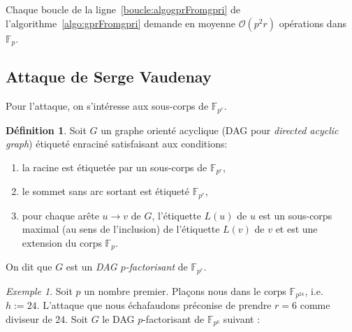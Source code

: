 \documentclass[a4paper, titlepage, 11pt]{article}
\theoremstyle{definition}
\newtheorem{defi}[theo]{Définition}
\theoremstyle{remark}
\newtheorem{exem}[theo]{Exemple}
\def\O{\mathcal O}
\def\gf #1{\mathbb{F}_{#1}}
\begin{document}
Chaque boucle de la ligne~\ref{boucle:algogprFromgpri} de l'algorithme~\ref{algo:gprFromgpri} demande en moyenne $\O(p^2r)$ opérations dans $\gf{p}$.

\subsection{Attaque de Serge Vaudenay}

Pour l'attaque, on s'intéresse aux sous-corps de $\gf{p^r}$.

\begin{defi}
Soit $G$ un graphe orienté acyclique (DAG pour \textit{directed acyclic graph}) étiqueté enraciné satisfaisant aux conditions: \begin{enumerate}
\item la racine est étiquetée par un sous-corps de $\gf{p^r}$,
\item le sommet sans arc sortant est étiqueté $\gf{p^r}$,
\item pour chaque arête $u \rightarrow v$ de $G$, l'étiquette $L(u)$ de $u$ est un sous-corps maximal (au sens de l'inclusion) de l'étiquette $L(v)$ de $v$ et est une extension du corps $\gf{p}$.
\end{enumerate}
On dit que $G$ est un \textit{DAG $p$-factorisant} de $\gf{p^r}$.
\end{defi}

\begin{exem}
Soit $p$ un nombre premier. Plaçons nous dans le corps $\gf{p^{24}}$, i.e. $h := 24$. L'attaque que nous échafaudons préconise de prendre $r = 6$ comme diviseur de $24$. Soit $G$ le DAG $p$-factorisant de $\gf{p^6}$ suivant :
\begin{figure}[h]
\begin{center}
\end{center}
\end{figure}
\end{exem}
\end{document}
